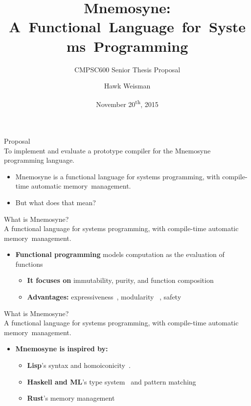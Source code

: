 \documentclass{beamer}
\title[Mnemosyne]{Mnemosyne: A~Functional~Language~for~Systems~Programming}
\subtitle{CMPSC600 Senior Thesis Proposal}
\author[Hawk Weisman]{Hawk Weisman}
\institute[Allegheny College]{Department of Computer Science \\ Allegheny College}
\date{November 20\textsuperscript{th}, 2015}
\begin{document}
\maketitle

\begin{frame}
\alert{\huge{Proposal}}\\
\large{To implement and evaluate a prototype compiler for the Mnemosyne programming language.}
\begin{itemize}
    \item Mnemosyne is a functional language for systems programming, with compile-time automatic memory~management.
    \item But what does that mean?
\end{itemize}
\end{frame}

\begin{frame}
\alert{\huge{What is Mnemosyne?}}\\
\large{\alert{A functional language} for systems programming, with compile-time automatic memory~management.} \normalsize
\begin{itemize}
\item<2->
\textbf{Functional programming} models computation as the evaluation of functions~\cite{Wise:2003:FP:1074100.1074416,hughes1989functional}
\begin{itemize}
    \item<2-> \textbf{It focuses on} immutability, purity, and function composition
    \item<3> \textbf{Advantages:} expressiveness~\cite{hughes1989functional,hudak1994haskell}, modularity %
    ~\cite{hughes1989functional,hudak1994haskell}, safety
    \end{itemize}
\end{itemize}
\end{frame}

\begin{frame}
\alert{\huge{What is Mnemosyne?}}\\
\large{\alert{A functional language} for systems programming, with compile-time automatic memory~management.} \normalsize
\begin{itemize}
\item
\textbf{Mnemosyne is inspired by:}
    \begin{itemize}
        \item\textbf{Lisp}'s syntax and homoiconicity~\cite{vanderhart2010macros,sicp}.
        \item\textbf{Haskell and ML}'s type system~\cite{jones2003haskell,hudak1992gentle,hudak1992report} and pattern matching~\cite{jones2003haskell,maranget2007warnings,Krishnaswami:2009:FPM:1594834.1480927,hudak1992report}
        \item\textbf{Rust}'s memory management~\cite{whyrust,whyrust}
    \end{itemize}

\end{itemize}
\end{frame}
\end{document}
